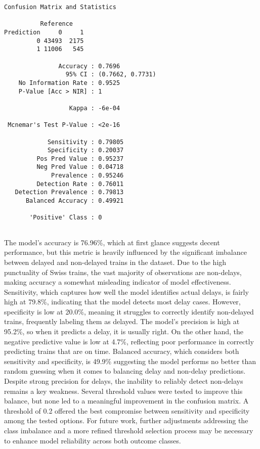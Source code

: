 \documentclass[
]{article}
\begin{document}
\begin{verbatim}
Confusion Matrix and Statistics

          Reference
Prediction     0     1
         0 43493  2175
         1 11006   545
                                          
               Accuracy : 0.7696          
                 95% CI : (0.7662, 0.7731)
    No Information Rate : 0.9525          
    P-Value [Acc > NIR] : 1               
                                          
                  Kappa : -6e-04          
                                          
 Mcnemar's Test P-Value : <2e-16          
                                          
            Sensitivity : 0.79805         
            Specificity : 0.20037         
         Pos Pred Value : 0.95237         
         Neg Pred Value : 0.04718         
             Prevalence : 0.95246         
         Detection Rate : 0.76011         
   Detection Prevalence : 0.79813         
      Balanced Accuracy : 0.49921         
                                          
       'Positive' Class : 0               
                                          
\end{verbatim}

The model's accuracy is 76.96\%, which at first glance suggests decent
performance, but this metric is heavily influenced by the significant
imbalance between delayed and non-delayed trains in the dataset. Due to
the high punctuality of Swiss trains, the vast majority of observations
are non-delays, making accuracy a somewhat misleading indicator of model
effectiveness. Sensitivity, which captures how well the model identifies
actual delays, is fairly high at 79.8\%, indicating that the model
detects most delay cases. However, specificity is low at 20.0\%, meaning
it struggles to correctly identify non-delayed trains, frequently
labeling them as delayed. The model's precision is high at 95.2\%, so
when it predicts a delay, it is usually right. On the other hand, the
negative predictive value is low at 4.7\%, reflecting poor performance
in correctly predicting trains that are on time. Balanced accuracy,
which considers both sensitivity and specificity, is 49.9\% suggesting
the model performs no better than random guessing when it comes to
balancing delay and non-delay predictions. Despite strong precision for
delays, the inability to reliably detect non-delays remains a key
weakness. Several threshold values were tested to improve this balance,
but none led to a meaningful improvement in the confusion matrix. A
threshold of 0.2 offered the best compromise between sensitivity and
specificity among the tested options. For future work, further
adjustments addressing the class imbalance and a more refined threshold
selection process may be necessary to enhance model reliability across
both outcome classes.
\end{document}

